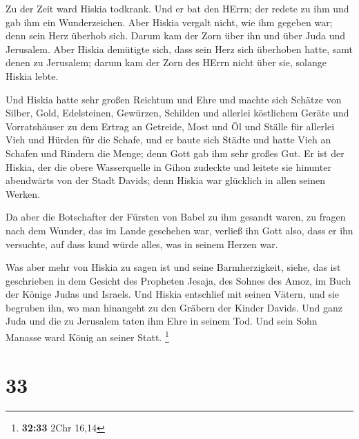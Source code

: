  Zu der Zeit ward Hiskia todkrank. Und er bat den HErrn;
der redete zu ihm und gab ihm ein Wunderzeichen.  Aber
Hiskia vergalt nicht, wie ihm gegeben war; denn sein Herz überhob sich.
Darum kam der Zorn über ihn und über Juda und Jerusalem. 
Aber Hiskia demütigte sich, dass sein Herz sich überhoben hatte, samt
denen zu Jerusalem; darum kam der Zorn des HErrn nicht über sie, solange
Hiskia lebte.

 Und Hiskia hatte sehr großen Reichtum und Ehre und machte
sich Schätze von Silber, Gold, Edelsteinen, Gewürzen, Schilden und
allerlei köstlichem Geräte  und Vorratshäuser zu dem Ertrag
an Getreide, Most und Öl und Ställe für allerlei Vieh und Hürden für die
Schafe,  und er baute sich Städte und hatte Vieh an Schafen
und Rindern die Menge; denn Gott gab ihm sehr großes Gut. 
Er ist der Hiskia, der die obere Wasserquelle in Gihon zudeckte und
leitete sie hinunter abendwärts von der Stadt Davids; denn Hiskia war
glücklich in allen seinen Werken.

 Da aber die Botschafter der Fürsten von Babel zu ihm
gesandt waren, zu fragen nach dem Wunder, das im Lande geschehen war,
verließ ihn Gott also, dass er ihn versuchte, auf dass kund würde alles,
was in seinem Herzen war.

 Was aber mehr von Hiskia zu sagen ist und seine
Barmherzigkeit, siehe, das ist geschrieben in dem Gesicht des Propheten
Jesaja, des Sohnes des Amoz, im Buch der Könige Judas und Israels.
 Und Hiskia entschlief mit seinen Vätern, und sie begruben
ihn, wo man hinangeht zu den Gräbern der Kinder Davids. Und ganz Juda
und die zu Jerusalem taten ihm Ehre in seinem Tod. Und sein Sohn Manasse
ward König an seiner Statt. \footnote{\textbf{32:33} 2Chr 16,14}

\hypertarget{section-5}{%
\section{33}\label{section-5}}

